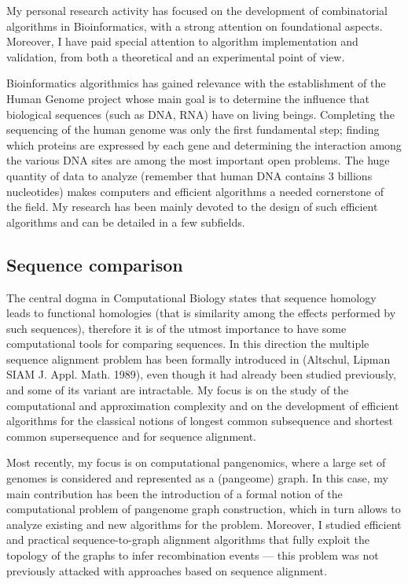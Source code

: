 \documentclass[11pt,a4paper,roman]{moderncv}
\begin{document}
My personal research activity has focused on the development of combinatorial
algorithms in Bioinformatics, with a strong attention on foundational aspects.
Moreover, I have paid special attention to algorithm implementation and validation, from both a theoretical and an experimental point of view.


Bioinformatics algorithmics has gained relevance with the establishment of the
Human Genome project whose main goal is to determine the influence that
biological sequences (such as DNA, RNA) have on living beings.
Completing the sequencing of the human genome was only the first
fundamental step; finding which proteins are expressed by each gene and
determining the interaction among the various DNA sites are among the
most important open problems. The huge quantity of data to
analyze (remember that human DNA contains 3 billions nucleotides) makes
computers and efficient algorithms a needed cornerstone of the field.
My research has been mainly devoted to the design of such
efficient algorithms and can be detailed in a few subfields.

\subsection{Sequence comparison}\label{sequence-comparison}

The central dogma in Computational Biology states that sequence homology
leads to functional homologies (that is similarity among the effects
performed by such sequences), therefore it is of the utmost importance
to have some computational tools for comparing sequences. In this
direction the multiple sequence alignment problem has been formally
introduced in (Altschul, Lipman SIAM J. Appl. Math. 1989), even though
it had already been studied previously, and some of its variant are
intractable. My focus is on the study of the computational and approximation
complexity and on the development of efficient algorithms for the classical
notions of longest common subsequence and shortest common supersequence and for
sequence alignment.

Most recently, my focus is on computational pangenomics, where a large set of
genomes is considered and represented as a (pangeome) graph.
In this case, my main contribution has been the introduction of a formal notion of the computational
problem of pangenome graph construction, which in turn allows to analyze
existing and new algorithms for the problem.
Moreover, I studied efficient and practical
sequence-to-graph alignment algorithms that fully exploit the topology of the
graphs to infer recombination events --- this problem was not previously
attacked with approaches based on sequence alignment.
\end{document}
